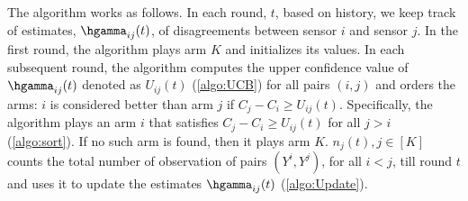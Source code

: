 The algorithm works as follows. In each round, $t$, based on history, we keep track of estimates, $\hgamma_{ij}(t)$, of disagreements between sensor $i$ and sensor $j$.  %
In the first round, the algorithm plays arm $K$ and initializes its values. In each subsequent round, the algorithm computes the upper confidence value of $\hgamma_{ij}(t)$ denoted as $U_{ij}(t)$ (\ref{algo:UCB}) for all pairs $(i,j)$ and orders the arms: $i$ is considered better than arm $j$ if $C_j-C_i \geq U_{ij}(t)$. Specifically, the algorithm plays an arm $i$ that satisfies $C_j-C_i \geq U_{ij}(t)$ for all $j>i$ (\ref{algo:sort}). If no such arm is found, then it plays arm $K$.  $n_j(t), j\in [K] $ counts the total number of observation of pairs $(Y^i, Y^j)$, for all $i<j$, till round $t$ and uses it to update the estimates $\hgamma_{ij}(t)$ (\ref{algo:Update}).%
